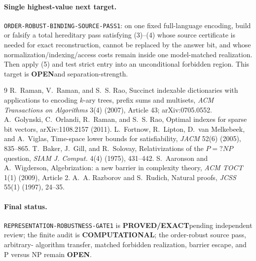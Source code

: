 \documentclass[11pt]{article}
\newcommand{\EXACT}{\textbf{PROVED/EXACT}}
\newcommand{\COMP}{\textbf{COMPUTATIONAL}}
\newcommand{\OPEN}{\textbf{OPEN}}
\begin{document}
\paragraph{Single highest-value next target.}
\texttt{ORDER-ROBUST-BINDING-SOURCE-PASS1}: on one fixed full-language
encoding, build or falsify a total hereditary pass satisfying (3)--(4) whose
source certificate is needed for exact reconstruction, cannot be replaced by
the answer bit, and whose normalization/indexing/access costs remain inside
one model-matched realization.  Then apply (5) and test strict entry into an
unconditional forbidden region.  This target is \OPEN and
separation-strength.

\begin{thebibliography}{9}
 R.~Raman, V.~Raman, and S.~S. Rao,
Succinct indexable dictionaries with applications to encoding $k$-ary trees,
prefix sums and multisets, \emph{ACM Transactions on Algorithms} 3(4) (2007),
Article 43; arXiv:0705.0552.
 A.~Golynski, C.~Orlandi, R.~Raman, and S.~S. Rao,
Optimal indexes for sparse bit vectors, arXiv:1108.2157 (2011).
 L.~Fortnow, R.~Lipton, D.~van Melkebeek, and A.~Viglas,
Time-space lower bounds for satisfiability, \emph{JACM} 52(6) (2005), 835--865.
 T.~Baker, J.~Gill, and R.~Solovay,
Relativizations of the $P=?NP$ question, \emph{SIAM J. Comput.} 4(4) (1975),
431--442.
 S.~Aaronson and A.~Wigderson,
Algebrization: a new barrier in complexity theory, \emph{ACM TOCT} 1(1)
(2009), Article 2.
 A.~A. Razborov and S.~Rudich,
Natural proofs, \emph{JCSS} 55(1) (1997), 24--35.
\end{thebibliography}

\paragraph{Final status.}
\texttt{REPRESENTATION-ROBUSTNESS-GATE1} is \EXACT pending independent
review; the finite audit is \COMP; the order-robust source pass, arbitrary-
algorithm transfer, matched forbidden realization, barrier escape, and
P versus NP remain \OPEN.
\end{document}
